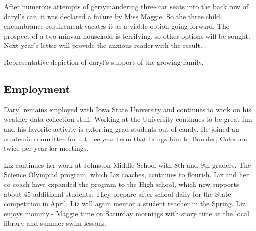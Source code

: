 \documentclass{article}
\makeatletter
\newenvironment{figurehere}
  {\def\@captype{figure}}
  {}
\makeatother
\begin{document}
\begin{multicols}{2}
After numerous attempts of gerrymandering three car seats into the back row of
daryl's car, it was declared a failure by Miss Maggie.  So the three child
encumbrance requirement vacates it as a viable option going forward.  The
prospect of a two minvan household is terrifying, so other options will be
sought.  Next year's letter will provide the anxious reader with the result.

\begin{figurehere}
 \centering   
 \caption{Representative depiction of daryl's support of the growing family.}
\end{figurehere}

\subsection{Employment}
Daryl remains employed with Iowa State University and continues to work on 
his weather data collection stuff.  Working at the University continues to be
great fun and his favorite activity is extorting grad students out of candy. He
joined an academic committee for a three year term that brings him to Boulder, 
Colorado twice per year for meetings.

Liz continues her work at Johnston Middle School with 8th and 9th graders. 
The Science Olympiad program, which Liz coaches, continues to flourish. 
Liz and her co-coach have expanded the program to the High school, which 
now supports about 45 additional students.  They prepare after school 
daily for the State competition in April.  Liz will again mentor a student 
teacher in the Spring.  Liz enjoys mommy - Maggie time on Saturday 
mornings with story time at the local library and summer swim lessons.


\end{multicols}
\end{document}
